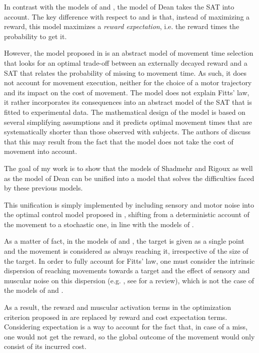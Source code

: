 \documentclass[pdftex,a4paper,11pt]{report}
\begin{document}
In contrast with the models of \cite{shadmehr10} and \cite{rigoux12_plos}, the model of Dean \cite{Dean2007} takes the SAT into account. The key difference with respect to \cite{shadmehr10} and \cite{rigoux12_plos} is that, instead of maximizing a reward, this model maximizes a {\em reward expectation}, i.e. the reward times the probability to get it.

However, the model proposed in \cite{Dean2007} is an abstract model of movement time selection that looks for an optimal trade-off between an externally decayed reward and a SAT that relates the probability of missing to movement time. As such, it does not account for movement execution, neither for the choice of a motor trajectory and its impact on the cost of movement.
The model does not explain Fitts' law, it rather incorporates its consequences into an abstract model of the SAT that is fitted to experimental data.
The mathematical design of the model is based on several simplifying assumptions and it predicts optimal movement times that are systematically shorter than those observed with subjects. The authors of \cite{Dean2007} discuss that this may result from the fact that the model does not take the cost of movement into account.

The goal of my work is to show that the models of Shadmehr \cite{shadmehr10} and Rigoux \cite{rigoux12_plos} as well as the model of Dean \cite{Dean2007} can be unified into a model that solves the difficulties faced by these previous models. 

This unification is simply implemented by including sensory and motor noise into the optimal control model proposed in \cite{rigoux12_plos}, shifting from a deterministic account of the movement to a stochastic one, in line with the models of \cite{harris98_N,todorov02_NN,todorov04_NN,todorov05_NC,li2006}.

As a matter of fact, in the models of \cite{shadmehr10} and \cite{rigoux12_plos}, the target is given as a single point and the movement is considered as always reaching it, irrespective of the size of the target. In order to fully account for Fitts' law, one must consider the intrinsic dispersion of reaching movements towards a target and the effect of sensory and muscular noise on this dispersion (e.g. \cite{harris98_N}, see \cite{faisal08} for a review), which is not the case of the models of \cite{shadmehr10} and \cite{rigoux12_plos}. 

As a result, the reward and muscular activation terms in the optimization criterion proposed in \cite{rigoux12_plos} are replaced by reward and cost expectation terms. Considering expectation is a way to account for the fact that, in case of a miss, one would not get the reward, so the global outcome of the movement would only consist of its incurred cost. 
\end{document}
